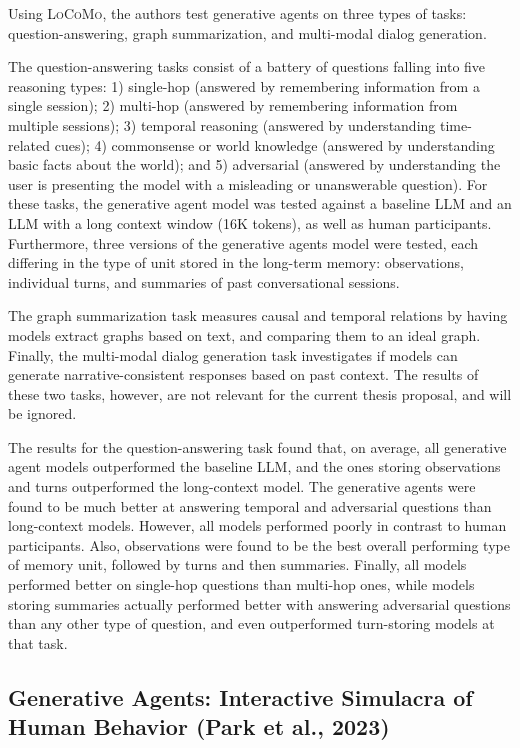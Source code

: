 Using \textsc{LoCoMo}, the authors test generative agents on three types of tasks: question-answering, graph summarization, and multi-modal dialog generation. 
	
The question-answering tasks consist of a battery of questions falling into five reasoning types: 1) single-hop (answered by remembering information from a single session); 2) multi-hop (answered by remembering information from multiple sessions); 3) temporal reasoning (answered by understanding time-related cues); 4) commonsense or world knowledge (answered by understanding basic facts about the world); and 5) adversarial (answered by understanding the user is presenting the model with a misleading or unanswerable question). For these tasks, the generative agent model was tested against a baseline LLM and an LLM with a long context window (16K tokens), as well as human participants. Furthermore, three versions of the generative agents model were tested, each differing in the type of unit stored in the long-term memory: observations, individual turns, and summaries of past conversational sessions. 
	
The graph summarization task measures causal and temporal relations by having models extract graphs based on text, and comparing them to an ideal graph. Finally, the multi-modal dialog generation task investigates if models can generate narrative-consistent responses based on past context. The results of these two tasks, however, are not relevant for the current thesis proposal, and will be ignored.
	
The results for the question-answering task found that, on average, all generative agent models outperformed the baseline LLM, and the ones storing observations and turns outperformed the long-context model. The generative agents were found to be much better at answering temporal and adversarial questions than long-context models. However, all models performed poorly in contrast to human participants. Also, observations were found to be the best overall performing type of memory unit, followed by turns and then summaries. Finally, all models performed better on single-hop questions than multi-hop ones, while models storing summaries actually performed better with answering adversarial questions than any other type of question, and even outperformed turn-storing models at that task.
	

\subsection{Generative Agents: Interactive Simulacra of Human Behavior (Park et al., 2023)}

